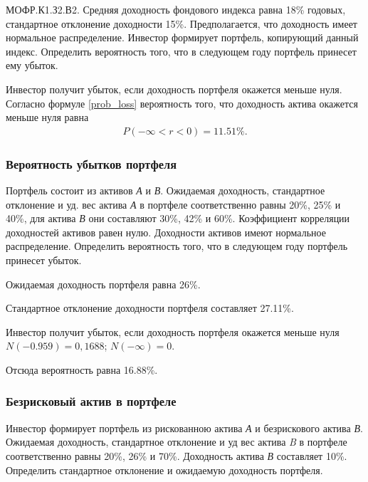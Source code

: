 \documentclass[12pt, table, a4paper,twoside]{exam}
\begin{document}
\begin{questions}
\question[10] МОФР.К1.З2.В2. Средняя доходность фондового индекса равна 18\% годовых, стандартное отклонение доходности 15\%. Предполагается, что доходность имеет нормальное распределение. Инвестор формирует портфель, копирующий данный индекс. Определить вероятность того, что в следующем году портфель принесет ему убыток.

\begin{solution}[6em]
	
	\raggedright
	Инвестор получит убыток, если доходность портфеля окажется меньше нуля. Согласно формуле \eqref{prob_loss} вероятность того, что доходность актива окажется меньше нуля равна
	\begin{align*}
	P(-\infty<r<0)=11.51\%.
	\end{align*}
\end{solution}


\subsubsection{Вероятность убытков портфеля}
\question[10] Портфель состоит из активов \textit{А} и \textit{В}. Ожидаемая доходность, стандартное отклонение и уд. вес актива \textit{А }в портфеле соответственно равны 20\%, 25\% и 40\%, для актива \textit{В} они составляют 30\%, 42\% и 60\%. Коэффициент корреляции доходностей активов равен нулю. Доходности активов имеют нормальное распределение. Определить вероятность того, что в следующем году портфель принесет убыток.

\begin{solution}[12em]

\raggedright
Ожидаемая доходность портфеля равна 26\%.

Стандартное отклонение доходности портфеля составляет 27.11\%.

Инвестор получит убыток, если доходность портфеля окажется меньше нуля
$N(-0.959)=0,1688$; $N(-\infty)= 0$. 

Отсюда вероятность равна 16.88\%.
\end{solution}


\subsubsection{Безрисковый актив в портфеле}
\question[10] Инвестор формирует портфель из рискованною актива \textit{А} и безрискового актива \textit{В}. Ожидаемая доходность, стандартное отклонение и уд вес актива \textit{B} в портфеле соответственно равны 20\%, 26\% и 70\%. Доходность актива \textit{В} составляет 10\%. Определить стандартное отклонение и ожидаемую доходность портфеля.


\end{questions}
\end{document}
